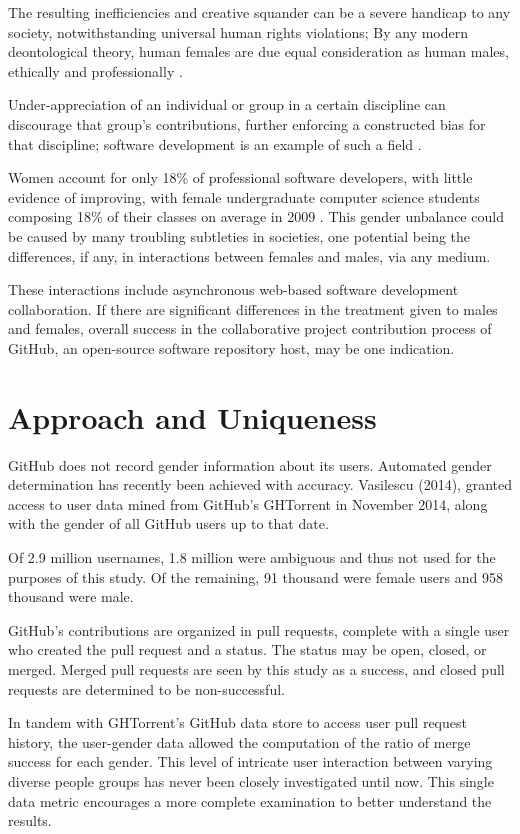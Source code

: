 \documentclass{sigplanconf}
\begin{document}
The resulting inefficiencies and creative
squander can be a severe handicap to any society, notwithstanding universal human rights
violations; By any modern deontological theory, human females are due equal
consideration as human males, ethically and professionally \citep{ethicsgender}.

Under-appreciation of an individual or group in a certain
discipline can discourage that group's contributions, further enforcing a
constructed bias for that discipline; software development is an example of such
a field \citep{genderscience}.

Women account for only 18\% of professional software developers,
\cite{sherdiversity} with little evidence of improving, with female
undergraduate computer science students composing 18\% of
their classes on average in 2009 \cite{womenundergrad}. This gender unbalance could be caused by many troubling subtleties
in societies, one potential being the differences, if any, in interactions
between females and males, via any medium.

These interactions include asynchronous web-based software development
collaboration. If there are significant differences in the treatment given to males
and females, overall success in the collaborative project contribution process
of GitHub, an open-source software repository host, may be one indication.

\section{Approach and Uniqueness}

GitHub does not record gender information about its users. Automated gender
determination has recently been achieved with accuracy. \cite{VasilescuIWC13}
Vasilescu (2014), granted access to user data mined from GitHub's GHTorrent in November 2014,
along with the gender of all GitHub users up to that date.

Of 2.9 million usernames, 1.8 million were ambiguous and thus
not used for the purposes of this study. Of the remaining, 91 thousand were
female users and 958 thousand were male.

GitHub's contributions are organized in pull requests, complete with a single
user who created the pull request and a status. The status may be open, closed,
or merged. Merged pull requests are seen by this study as a success, and closed pull
requests are determined to be non-successful.

In tandem with GHTorrent's GitHub data store to
access user pull request history, the user-gender data allowed the computation of
the ratio of merge success for each gender. This level of intricate user interaction
between varying diverse people groups has never been closely investigated until
now. This single data metric encourages a more complete examination to better
understand the results.
\end{document}
